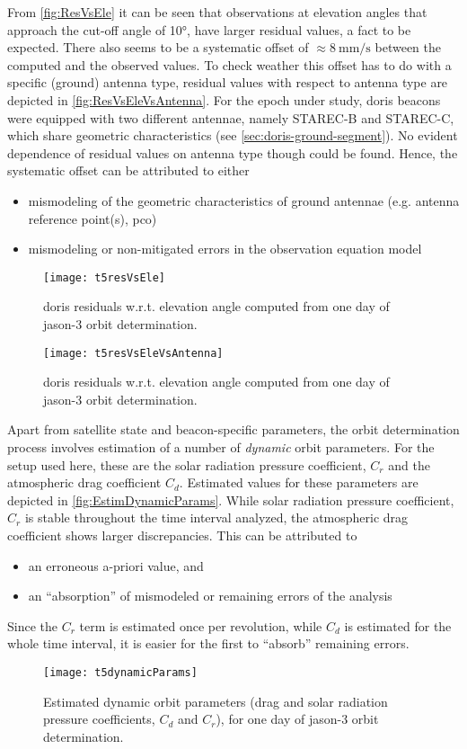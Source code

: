 From \autoref{fig:ResVsEle} it can be seen that observations at elevation angles that 
approach the cut-off angle of \ang{10}, have larger residual values, a fact to be expected. 
There also seems to be a systematic offset of $\approx \SI{8}{\milli\meter\per\second}$ 
between the computed and the observed values. To check weather this offset has to do 
with a specific (ground) antenna type, residual values with respect to antenna type 
are depicted in \autoref{fig:ResVsEleVsAntenna}. For the epoch under study, \gls{doris} 
beacons were equipped with two different antennae, namely STAREC-B and STAREC-C, which 
share geometric characteristics (see \autoref{sec:doris-ground-segment}). No evident 
dependence of residual values on antenna type though could be found. Hence, the 
systematic offset can be attributed to either
\begin{itemize}
  \item mismodeling of the geometric characteristics of ground antennae (e.g. antenna reference point(s), \gls{pco})
  \item mismodeling or non-mitigated errors in the observation equation model
\end{itemize}
\begin{figure}
    \centering
    \texttt{[image: t5resVsEle]}
    \caption{\gls{doris} residuals w.r.t. elevation angle computed from one day of \gls{jason}-3 orbit determination.}
    \label{fig:ResVsEle}
\end{figure}

\begin{figure}
    \centering
    \texttt{[image: t5resVsEleVsAntenna]}
    \caption{\gls{doris} residuals w.r.t. elevation angle computed from one day of \gls{jason}-3 orbit determination.}
    \label{fig:ResVsEleVsAntenna}
\end{figure}

Apart from satellite state and beacon-specific parameters, the orbit determination process 
involves estimation of a number of \emph{dynamic} orbit parameters. For the setup used here, 
these are the solar radiation pressure coefficient, $C_r$ and the atmospheric drag 
coefficient $C_d$. Estimated values for these parameters are depicted in 
\autoref{fig:EstimDynamicParams}. While solar radiation pressure coefficient, $C_r$ 
is stable throughout the time interval analyzed, the atmospheric drag coefficient 
shows larger discrepancies. This can be attributed to
\begin{itemize}
  \item an erroneous a-priori value, and
  \item an ``absorption'' of mismodeled or remaining errors of the analysis
\end{itemize}
Since the $C_r$ term is estimated once per revolution, while $C_d$ is estimated for the 
whole time interval, it is easier for the first to ``absorb'' remaining errors.
\begin{figure}
    \centering
    \texttt{[image: t5dynamicParams]}
    \caption{Estimated dynamic orbit parameters (drag and solar radiation pressure coefficients, $C_d$ and $C_r$), for one day of \gls{jason}-3 orbit determination.}
    \label{fig:EstimDynamicParams}
\end{figure}

